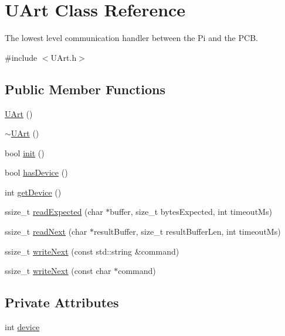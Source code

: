 \hypertarget{class_u_art}{}\section{U\+Art Class Reference}
\label{class_u_art}


The lowest level communication handler between the Pi and the P\+CB.  




{\ttfamily \#include $<$U\+Art.\+h$>$}

\subsection*{Public Member Functions}
\begin{DoxyCompactItemize}
\item 
\hyperlink{class_u_art_a2704c05ac50a1817a56d74010f18057a}{U\+Art} ()
\item 
\hyperlink{class_u_art_af512edbca927cd2c76b72c33c13c93d0}{$\sim$\+U\+Art} ()
\item 
bool \hyperlink{class_u_art_a51adaa81c08d92599768c0303e5abc94}{init} ()
\item 
bool \hyperlink{class_u_art_a40bc3c5d20a6c316004bab3ef45e6916}{has\+Device} ()
\item 
int \hyperlink{class_u_art_aa7d8ab3e9439a553764e0fd81d83f143}{get\+Device} ()
\item 
ssize\+\_\+t \hyperlink{class_u_art_a4dcaf74a46b8c76784511284f330a97f}{read\+Expected} (char $\ast$buffer, size\+\_\+t bytes\+Expected, int timeout\+Ms)
\item 
ssize\+\_\+t \hyperlink{class_u_art_aa4818ca67447e251680b4b8d28c8bba5}{read\+Next} (char $\ast$result\+Buffer, size\+\_\+t result\+Buffer\+Len, int timeout\+Ms)
\item 
ssize\+\_\+t \hyperlink{class_u_art_aad1ddb133fe430a92527584eec2e674f}{write\+Next} (const std\+::string \&command)
\item 
ssize\+\_\+t \hyperlink{class_u_art_a6353ec5c21b038ca034bacaca8873713}{write\+Next} (const char $\ast$command)
\end{DoxyCompactItemize}
\subsection*{Private Attributes}
\begin{DoxyCompactItemize}
\item 
int \hyperlink{class_u_art_a61fb55cc7c92c85f2219dffcfb58bc12}{device}
\end{DoxyCompactItemize}


